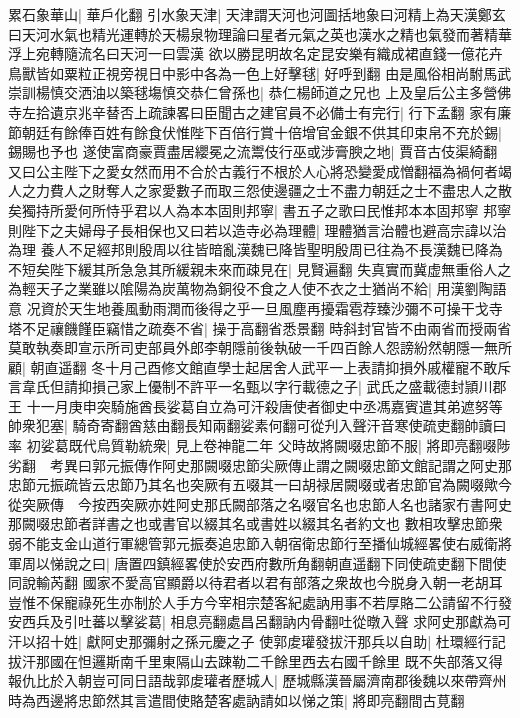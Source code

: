 累石象華山|{
	華戶化翻}
引水象天津|{
	天津謂天河也河圖括地象曰河精上為天漢鄭玄曰天河水氣也精光運轉於天楊泉物理論曰星者元氣之英也漢水之精也氣發而著精華浮上宛轉隨流名曰天河一曰雲漢}
欲以勝昆明故名定昆安樂有織成裙直錢一億花卉鳥獸皆如粟粒正視旁視日中影中各為一色上好擊毬|{
	好呼到翻}
由是風俗相尚駙馬武崇訓楊慎交洒油以築毬塲慎交恭仁曾孫也|{
	恭仁楊師道之兄也}
上及皇后公主多營佛寺左拾遺京兆辛替否上疏諫畧曰臣聞古之建官員不必備士有完行|{
	行下孟翻}
家有廉節朝廷有餘俸百姓有餘食伏惟陛下百倍行賞十倍增官金銀不供其印束帛不充於錫|{
	錫賜也予也}
遂使富商豪賈盡居纓冕之流鬻伎行巫或涉膏腴之地|{
	賈音古伎渠綺翻}
又曰公主陛下之愛女然而用不合於古義行不根於人心將恐變愛成憎翻福為禍何者竭人之力費人之財奪人之家愛數子而取三怨使邊疆之士不盡力朝廷之士不盡忠人之散矣獨持所愛何所恃乎君以人為本本固則邦寧|{
	書五子之歌曰民惟邦本本固邦寧}
邦寧則陛下之夫婦母子長相保也又曰若以造寺必為理體|{
	理體猶言治體也避高宗諱以治為理}
養人不足經邦則殷周以往皆暗亂漢魏已降皆聖明殷周已往為不長漢魏已降為不短矣陛下緩其所急急其所緩親未來而疎見在|{
	見賢遍翻}
失真實而冀虚無重俗人之為輕天子之業雖以隂陽為炭萬物為銅役不食之人使不衣之士猶尚不給|{
	用漢劉陶語意}
况資於天生地養風動雨潤而後得之乎一旦風塵再擾霜雹荐臻沙彌不可操干戈寺塔不足禳饑饉臣竊惜之疏奏不省|{
	操于高翻省悉景翻}
時斜封官皆不由兩省而授兩省莫敢執奏即宣示所司吏部員外郎李朝隱前後執破一千四百餘人怨謗紛然朝隱一無所顧|{
	朝直遥翻}
冬十月己酉修文館直學士起居舍人武平一上表請抑損外戚權寵不敢斥言韋氏但請抑損己家上優制不許平一名甄以字行載德之子|{
	武氏之盛載德封頴川郡王}
十一月庚申突騎施酋長娑葛自立為可汗殺唐使者御史中丞馮嘉賓遣其弟遮努等帥衆犯塞|{
	騎奇寄翻酋慈由翻長知兩翻娑素何翻可從刋入聲汗音寒使疏吏翻帥讀曰率}
初娑葛既代烏質勒統衆|{
	見上卷神龍二年}
父時故將闕啜忠節不服|{
	將即亮翻啜陟劣翻　考異曰郭元振傳作阿史那闕啜忠節尖厥傳止謂之闕啜忠節文館記謂之阿史那忠節元振疏皆云忠節乃其名也突厥有五啜其一曰胡禄居闕啜或者忠節官為闕啜歟今從突厥傳　今按西突厥亦姓阿史那氏闕部落之名啜官名也忠節人名也諸家冇書阿史那闕啜忠節者詳書之也或書官以綴其名或書姓以綴其名者約文也}
數相攻擊忠節衆弱不能支金山道行軍總管郭元振奏追忠節入朝宿衛忠節行至播仙城經畧使右威衛將軍周以悌說之曰|{
	唐置四鎮經畧使於安西府數所角翻朝直遥翻下同使疏吏翻下間使同說輸芮翻}
國家不愛高官顯爵以待君者以君有部落之衆故也今脱身入朝一老胡耳豈惟不保寵祿死生亦制於人手方今宰相宗楚客紀處訥用事不若厚賂二公請留不行發安西兵及引吐蕃以擊娑葛|{
	相息亮翻處昌呂翻訥内骨翻吐從暾入聲}
求阿史那獻為可汗以招十姓|{
	獻阿史那彌射之孫元慶之子}
使郭䖍瓘發拔汗那兵以自助|{
	杜環經行記拔汗那國在怛邏斯南千里東隔山去踈勒二千餘里西去右國千餘里}
既不失部落又得報仇比於入朝豈可同日語哉郭䖍瓘者歷城人|{
	歷城縣漢晉屬濟南郡後魏以來帶齊州}
時為西邊將忠節然其言遣間使賂楚客處訥請如以悌之策|{
	將即亮翻間古莧翻}

